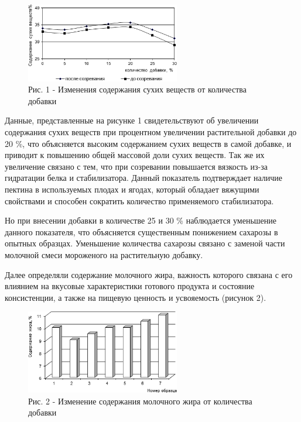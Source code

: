 \begin{figure}[H]
	\centering
	\includegraphics[width=0.6\textwidth]{media/pish2/image10}
	\caption*{Рис. 1 - Изменения содержания сухих веществ от количества добавки}
\end{figure}

\begin{multicols}{2}
Данные, представленные на рисунке 1 свидетельствуют об увеличении
содержания сухих веществ при процентном увеличении растительной добавки
до 20 \%, что объясняется высоким содержанием сухих веществ в самой
добавке, и приводит к повышению общей массовой доли сухих веществ. Так
же их увеличение связано с тем, что при созревании повышается вязкость
из-за гидратации белка и стабилизатора. Данный показатель подтверждает
наличие пектина в используемых плодах и ягодах, который обладает
вяжущими свойствами и способен сократить количество применяемого
стабилизатора.

Но при внесении добавки в количестве 25 и 30 \% наблюдается уменьшение
данного показателя, что объясняется существенным понижением сахарозы в
опытных образцах. Уменьшение количества сахарозы связано с заменой части
молочной смеси мороженого на растительную добавку.

Далее определяли содержание молочного жира, важность которого связана с
его влиянием на вкусовые характеристики готового продукта и состояние
консистенции, а также на пищевую ценность и усвояемость (рисунок 2).
\end{multicols}

\begin{figure}[H]
	\centering
	\includegraphics[width=0.6\textwidth]{media/pish2/image11}
	\caption*{ - без добавки; 2 - 5 \%; 3 - 10 \%; 4 - 15 \%; 5 - 20 \%; 6 - 25 \%; 7 - 30 \%}
	\caption*{Рис. 2 - Изменение содержания молочного жира от количества добавки}
\end{figure}

